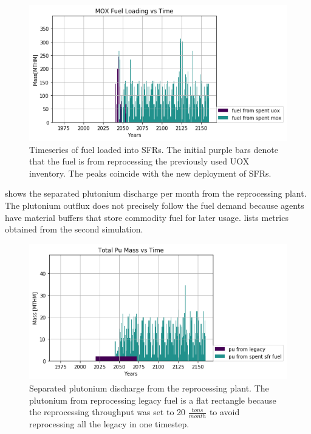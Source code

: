 \begin{figure}[htbp!]
	\begin{center}
		\includegraphics[scale=0.7]{./images/french-transition/where_fuel.png}
	\end{center}
	\caption{Timeseries of fuel loaded into \glspl{SFR}.
			 The initial purple bars denote that the fuel is from reprocessing
			 the previously used \gls{UOX} inventory. The peaks coincide
			 with the new deployment of \glspl{SFR}.}
	\label{fig:fuel}
\end{figure}
  shows the separated plutonium discharge
per month from the reprocessing plant. The plutonium outflux
does not precisely follow the fuel demand because \Cyclus agents have
material buffers that store commodity fuel for later usage. 
 lists metrics obtained from the second simulation.

\begin{figure}[htbp!]
	\begin{center}
		\includegraphics[scale=0.7]{./images/french-transition/pu.png}
	\end{center}
	\caption{Separated plutonium discharge from the reprocessing plant.
			 The plutonium from reprocessing legacy fuel is a flat rectangle because the 
			 reprocessing throughput was set to 20 $\frac{tons}{month}$ to avoid reprocessing
			 all the legacy in one timestep.}
	\label{fig:pu_no_cum}
\end{figure}

